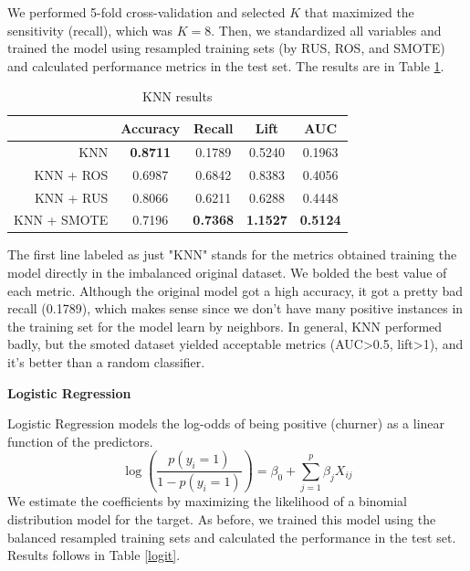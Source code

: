 \documentclass[12pt,letterpaper]{article}
\begin{document}
	We performed 5-fold cross-validation and selected $K$ that maximized the sensitivity (recall), which was $K=8$. Then, we standardized all variables and trained the model using resampled training sets (by RUS, ROS, and SMOTE) and calculated performance metrics in the test set. The results are in Table \ref{knn}.
	
	\begin{table}[!htb]
		\centering
		\addtolength{\tabcolsep}{6pt}    
		\begin{tabular}{|r|cccc|}
			\hline
			& Accuracy & Recall & Lift & AUC \\ 
			\hline
			KNN  & \textbf{0.8711} & 0.1789 & 0.5240 & 0.1963 \\ 
			KNN + ROS & 0.6987 & 0.6842 & 0.8383 & 0.4056 \\ 
			KNN + RUS & 0.8066 & 0.6211 & 0.6288 & 0.4448 \\ 
			KNN + SMOTE & 0.7196 & \textbf{0.7368} & \textbf{1.1527} & \textbf{0.5124} \\ 
			\hline
		\end{tabular}
	\caption{KNN results}
	\label{knn}
	\end{table}

 The first line labeled as just "KNN" stands for the metrics obtained training the model directly in the imbalanced original dataset. We bolded the best value of each metric. Although the original model got a high accuracy, it got a pretty bad recall (0.1789), which makes sense since we don't have many positive instances in the training set for the model learn by neighbors. In general, KNN performed badly, but the smoted dataset yielded acceptable metrics (AUC>0.5, lift>1), and it's better than a random classifier.
 
 \textbf{Logistic Regression}
 
 Logistic Regression models the log-odds of being positive (churner) as a linear function of the predictors.
 $$\log\left(\dfrac{p(y_i=1)}{1-p(y_i=1)}\right)=\beta_0+\sum_{j=1}^{p}\beta_jX_{ij}$$
 We estimate the coefficients by maximizing the likelihood of a binomial distribution model for the target.
 As before, we trained this model using the balanced resampled training sets and calculated the performance in the test set. Results follows in Table \ref{logit}.
 
\end{document}

